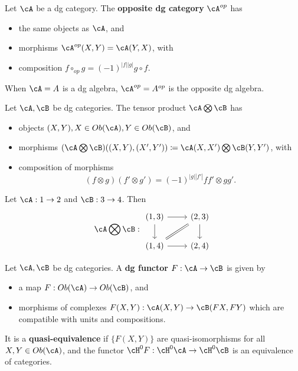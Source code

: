 \begin{defn}
Let $ \cA $ be a dg category. The {\bf opposite dg category} $ \cA^{op} $ has
\begin{itemize}
    \item the same objects as $ \cA $, and 
    \item morphisms $ \cA^{op}(X,Y) = \cA(Y,X) $, with 
    \item composition $ f \circ_{op} g = (-1)^{|f||g|}g\circ f $. 
\end{itemize}
\end{defn}

\begin{eg}
When $ \cA = A $ is a dg algebra, $ \cA^{op} = A^{op} $ is the  opposite dg algebra. 
\end{eg}

\begin{defn}
Let $ \cA,\cB $ be dg categories. The tensor product $ \cA\bigotimes\cB $ has 
\begin{itemize}
    \item objects $ (X,Y), X\in Ob(\cA), Y\in Ob(\cB) $, and 
    \item morphisms $ (\cA\bigotimes\cB)((X,Y),(X',Y')) \coloneqq \cA(X,X') \bigotimes \cB(Y,Y') $, with
    \item composition of morphisms
    \[ (f\otimes g)(f'\otimes g') = (-1)^{|g||f'|} ff'\otimes gg'. \]
\end{itemize}
\end{defn}

\begin{eg}
Let $ \cA : 1 \to 2 $ and $ \cB : 3 \to 4 $. Then 
\[ \cA\bigotimes\cB: \begin{tikzcd}
(1,3) \ar[r]\ar[d] & (2,3)\ar[d] \\
(1,4) \ar[r]\ar[ur,equal] & (2,4)
\end{tikzcd}\]
\end{eg}

\begin{defn}
Let $ \cA,\cB $ be dg categories. A {\bf dg functor} $ F: \cA \to \cB $ is given by 
\begin{itemize}
    \item a map $ F: Ob(\cA) \to Ob(\cB) $, and
    \item morphisms of complexes $ F(X,Y): \cA(X,Y) \to \cB(FX,FY) $ which are compatible with units and compositions.
\end{itemize}
It is a {\bf quasi-equivalence} if $ \{F(X,Y)\} $ are quasi-isomorphisms for all $ X,Y\in Ob(\cA) $, and the functor $ \cH^{0}F:\cH^{0}\cA \to \cH^{0}\cB $ is an equivalence of categories. 
\end{defn}


